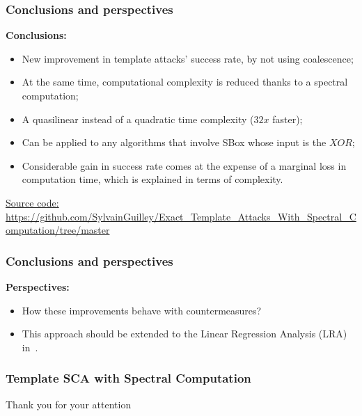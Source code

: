 \documentclass{beamer}
\begin{document}
\begin{frame}

\frametitle{Conclusions and perspectives}

\textbf{Conclusions:}
\begin{itemize}

\item  New improvement in template attacks' success rate, by not using coalescence;
\pause
\item At the same time, computational complexity is reduced
thanks to a spectral computation;

\pause
\item A quasilinear instead of a quadratic time complexity ($32x$ faster);

\pause
\item Can be applied to any algorithms that involve SBox whose input is the $XOR$;
\pause

\item  Considerable gain in success rate comes at the expense of a marginal loss in computation time, which is explained in terms of complexity.

\medskip
\end{itemize}
\underline{Source code:} \url{https://github.com/SylvainGuilley/Exact_Template_Attacks_With_Spectral_Computation/tree/master}
\end{frame}



\begin{frame}

\frametitle{Conclusions and perspectives}

\textbf{Perspectives:}
\begin{itemize}

\item  How these improvements behave with countermeasures?
\pause


\item This approach should be extended to the Linear Regression Analysis (LRA) in~\cite{DBLP:conf/cosade/OULADJ2020}.

\end{itemize}

\end{frame}

\begin{frame}
\frametitle{Template SCA with Spectral Computation}

\centering
\Huge Thank you for your attention
\end{frame}




\end{document}
